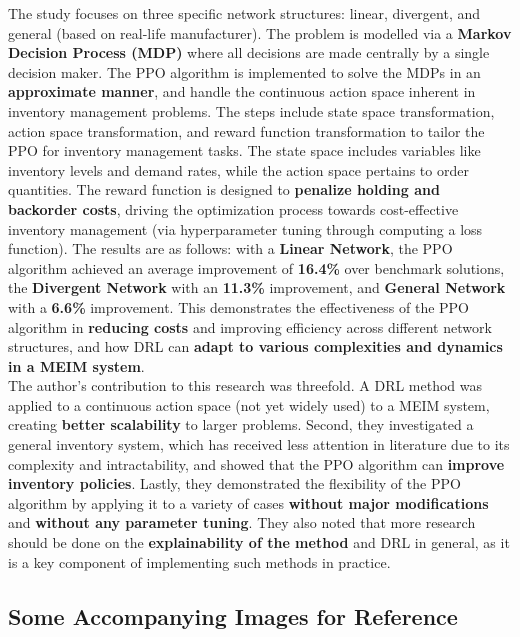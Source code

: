 \documentclass[12pt]{article}
\begin{document}
\noindent The study focuses on three specific network structures: linear, divergent, and general (based on real-life manufacturer). The problem is modelled via a \textbf{Markov Decision Process (MDP)} where all decisions are made centrally by a single decision maker. The PPO algorithm is implemented to solve the MDPs in an \textbf{approximate manner}, and handle the continuous action space inherent in inventory management problems. The steps include state space transformation, action space transformation, and reward function transformation to tailor the PPO for inventory management tasks. The state space includes variables like inventory levels and demand rates, while the action space pertains to order quantities. The reward function is designed to \textbf{penalize holding and backorder costs}, driving the optimization process towards cost-effective inventory management (via hyperparameter tuning through computing a loss function). The results are as follows: with a \textbf{Linear Network}, the PPO algorithm achieved an average improvement of \textbf{16.4\%} over benchmark solutions, the \textbf{Divergent Network} with an \textbf{11.3\%} improvement, and \textbf{General Network} with a \textbf{6.6\%} improvement. This demonstrates the effectiveness of the PPO algorithm in \textbf{reducing costs} and improving efficiency across different network structures, and how DRL can \textbf{adapt to various complexities and dynamics in a MEIM system}. \\ 

\noindent The author's contribution to this research was threefold. A DRL method was applied to a continuous action space (not yet widely used) to a MEIM system, creating \textbf{better scalability} to larger problems. Second, they investigated a general inventory system, which has received less attention in literature due to its complexity and intractability, and showed that the PPO algorithm can \textbf{improve inventory policies}. Lastly, they demonstrated the flexibility of the PPO algorithm by applying it to a variety of cases \textbf{without major modifications} and \textbf{without any parameter tuning}. They also noted that more research should be done on the \textbf{explainability of the method} and DRL in general, as it is a key component of implementing such methods in practice. 

\newpage

\subsection*{Some Accompanying Images for Reference}
\end{document}
